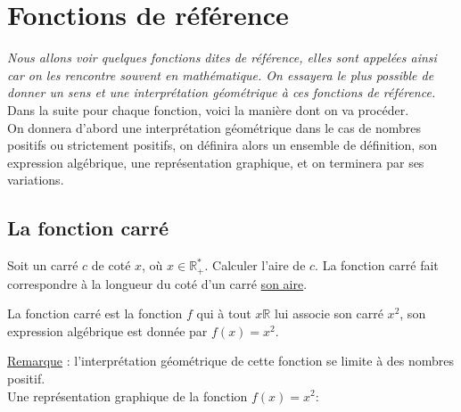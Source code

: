 \documentclass[french]{book}
\begin{document}
 \setcounter{chapter}{8}
\chapter{Fonctions de référence}
\textit{Nous allons voir quelques fonctions dites de référence, elles sont appelées ainsi car on les rencontre souvent en mathématique. On essayera le plus possible de donner un sens et une interprétation géométrique à ces fonctions de référence. } \\

Dans la suite pour chaque fonction, voici la manière dont on va procéder.\\

On donnera d'abord une interprétation géométrique dans le cas de nombres positifs ou strictement positifs, on définira alors un ensemble de définition, son expression algébrique, une représentation graphique, et on terminera par ses variations. 

\section{La fonction carré}
Soit un carré $c$ de coté $x$, où $x \in \mathbb{R}_+^*$. Calculer l'aire de $c$.
La fonction carré fait correspondre à la longueur du coté d'un carré \underline{son aire}.

\begin{defn}
La fonction carré est la fonction $f$ qui à tout $x \mathbb{R}$ lui associe son carré $x^2$, son expression algébrique est donnée par $f(x)=x^2$.\\
\end{defn}

\underline{Remarque} : l'interprétation géométrique de cette fonction se limite à des nombres positif.\\

Une représentation graphique de la fonction $f(x)=x^2$:
\begin{center}



\end{center}
\end{document}
